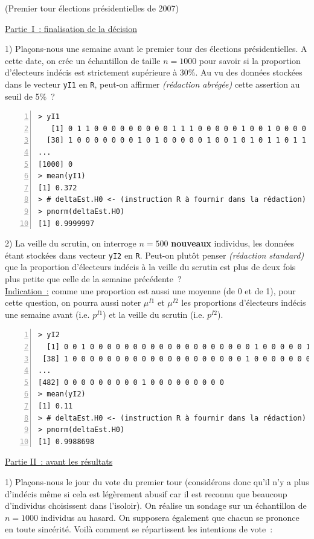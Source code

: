 \documentclass[10pt]{report}
\newcommand{\redabr}{\textit{(rédaction abrégée) }}
\newcommand{\redstd}{\textit{(rédaction standard) }}
\begin{document}
\begin{exercice} (Premier tour élections présidentielles de 2007)
${ }$

\noindent \underline{Partie~I~: finalisation de la décision}

1)  
Plaçons-nous une semaine avant le premier tour des élections présidentielles. A cette date, on crée un échantillon de taille $n=1000$ pour savoir si la proportion d'électeurs indécis est strictement supérieure à 30\%. Au vu des données stockées dans le vecteur \texttt{yI1} en \texttt{R}, peut-on affirmer \redabr cette assertion au seuil de 5\%~? 

\IndicR
\begin{Verbatim}[frame=leftline,fontfamily=tt,fontshape=n,numbers=left]
> yI1
   [1] 0 1 1 0 0 0 0 0 0 0 0 0 1 1 1 0 0 0 0 0 1 0 0 1 0 0 0 0 0 1 1 0 1 0 1 0 0
  [38] 1 0 0 0 0 0 0 0 1 0 1 0 0 0 0 0 1 0 0 1 0 1 0 1 1 0 1 1 1 1 0 0 0 0 0 0 1
...
[1000] 0
> mean(yI1)
[1] 0.372
> # deltaEst.H0 <- (instruction R à fournir dans la rédaction)
> pnorm(deltaEst.H0)
[1] 0.9999997
\end{Verbatim}





2) 
La veille du scrutin, on interroge $n=500$ {\bf nouveaux} individus, les données étant stockées dans vecteur \texttt{yI2} en \texttt{R}. Peut-on plutôt penser \redstd que la proportion d'électeurs indécis à la veille du scrutin est plus de deux fois plus petite que celle de la semaine précédente~?  \\
\underline{Indication~:} comme une proportion est aussi une moyenne (de 0 et de 1), pour cette question, on pourra aussi noter $\mu^{I1}$ et $\mu^{I2}$ les proportions d'électeurs indécis une semaine avant (i.e. $p^{I1}$) et la veille du scrutin (i.e. $p^{I2}$).


\IndicR
\begin{Verbatim}[frame=leftline,fontfamily=tt,fontshape=n,numbers=left]
> yI2
  [1] 0 0 1 0 0 0 0 0 0 0 0 0 0 0 0 0 0 0 0 0 0 0 1 0 0 0 0 0 1 0 0 0 0 0 1 0 0
 [38] 1 0 0 0 0 0 0 0 0 0 0 0 0 0 0 0 0 0 0 0 0 1 0 0 0 0 0 0 0 0 0 1 0 0 0 0 0
...
[482] 0 0 0 0 0 0 0 0 0 1 0 0 0 0 0 0 0 0 0
> mean(yI2)
[1] 0.11
> # deltaEst.H0 <- (instruction R à fournir dans la rédaction)
> pnorm(deltaEst.H0)
[1] 0.9988698
\end{Verbatim}




\noindent \underline{Partie II~: avant les résultats}

1) 
Plaçons-nous le jour du vote du premier tour (considérons donc qu'il n'y a plus d'indécis même si cela est légèrement abusif car il est reconnu que beaucoup d'individus choisissent dans l'isoloir). On réalise un sondage sur un échantillon de $n=1000$ individus au hasard. On supposera également que chacun se prononce en toute sincérité. Voilà comment se répartissent les intentions de vote~:


\end{exercice}
\end{document}
